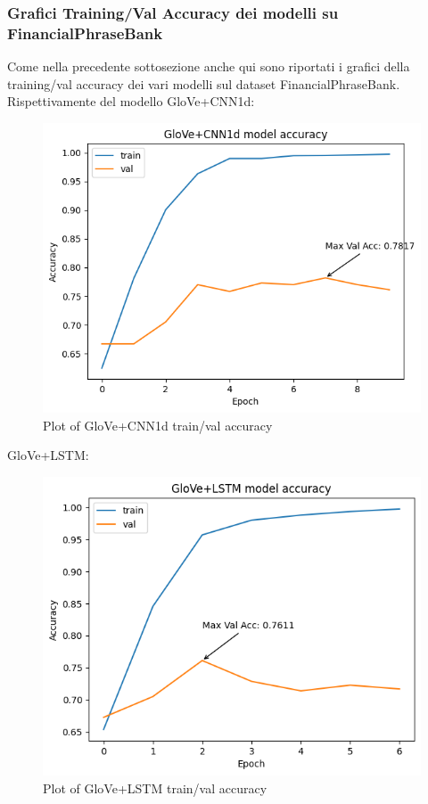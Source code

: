 \newpage

\subsubsection{Grafici Training/Val Accuracy dei modelli su FinancialPhraseBank}
Come nella precedente sottosezione anche qui sono riportati i grafici della training/val accuracy dei vari modelli sul dataset FinancialPhraseBank.\newline
Rispettivamente del modello GloVe+CNN1d:
\begin{figure}[!ht]
    \centering
    \includegraphics[width=12cm]{./images/plot_cnn.png}
    \caption{Plot of GloVe+CNN1d train/val accuracy}
\end{figure}
\newline
GloVe+LSTM:
\begin{figure}[!ht]
    \centering
    \includegraphics[width=11.5cm]{./images/plot_lstm.png}
    \caption{Plot of GloVe+LSTM train/val accuracy}
\end{figure}
